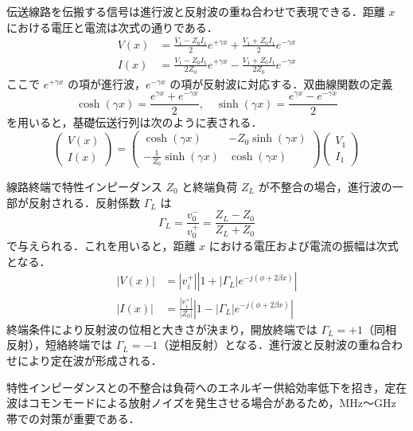 \documentclass[
  a4paper,  %
  11pt,     %
]{ltjsarticle}
\begin{document}
伝送線路を伝搬する信号は進行波と反射波の重ね合わせで表現できる．距離 $x$ における電圧と電流は次式の通りである．
\begin{align}
  V(x) &= \frac{V_1 - Z_0 I_1}{2}e^{+\gamma x} + \frac{V_1 + Z_0 I_1}{2}e^{-\gamma x} \\
  I(x) &= \frac{V_1 - Z_0 I_1}{2Z_0}e^{+\gamma x} - \frac{V_1 + Z_0 I_1}{2Z_0}e^{-\gamma x}
\end{align}
ここで $e^{+\gamma x}$ の項が進行波，$e^{-\gamma x}$ の項が反射波に対応する．双曲線関数の定義
\begin{equation}
  \cosh(\gamma x) = \frac{e^{\gamma x} + e^{-\gamma x}}{2}, \quad \sinh(\gamma x) = \frac{e^{\gamma x} - e^{-\gamma x}}{2}
\end{equation}
を用いると，基礎伝送行列は次のように表される．
\begin{equation}
  \begin{pmatrix} V(x) \\ I(x) \end{pmatrix} =
  \begin{pmatrix} \cosh(\gamma x) & -Z_0 \sinh(\gamma x) \\ -\frac{1}{Z_0}\sinh(\gamma x) & \cosh(\gamma x) \end{pmatrix}
  \begin{pmatrix} V_1 \\ I_1 \end{pmatrix}
\end{equation}

線路終端で特性インピーダンス $Z_0$ と終端負荷 $Z_L$ が不整合の場合，進行波の一部が反射される．反射係数 $\Gamma_L$ は
\begin{equation}
  \Gamma_L = \frac{v_0^-}{v_0^+} = \frac{Z_L - Z_0}{Z_L + Z_0}
\end{equation}
で与えられる．これを用いると，距離 $x$ における電圧および電流の振幅は次式となる．
\begin{align}
  |V(x)| &= |v_i^+| \left|1 + |\Gamma_L| e^{-j(\phi+2\beta x)}\right| \\
  |I(x)| &= \frac{|v_i^+|}{|Z_0|} \left|1 - |\Gamma_L| e^{-j(\phi+2\beta x)}\right|
\end{align}
終端条件により反射波の位相と大きさが決まり，開放終端では $\Gamma_L = +1$（同相反射），短絡終端では $\Gamma_L = -1$（逆相反射）となる．進行波と反射波の重ね合わせにより定在波が形成される．

特性インピーダンスとの不整合は負荷へのエネルギー供給効率低下を招き，定在波はコモンモードによる放射ノイズを発生させる場合があるため，MHz〜GHz 帯での対策が重要である．
\end{document}
